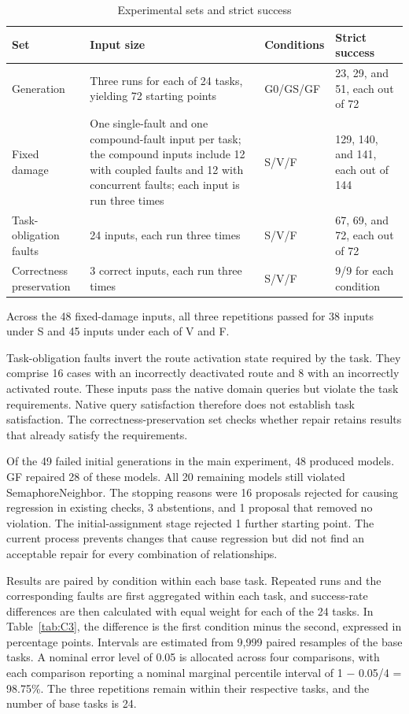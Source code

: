 \documentclass[pdflatex,iicol,sn-mathphys-num]{sn-jnl}
\begin{document}
\begin{table}[!tbp]
\centering
\caption{Experimental sets and strict success}\label{tab:C2}
\small
\setlength{\tabcolsep}{4pt}
\renewcommand{\arraystretch}{1.20}
\begin{tabularx}{\textwidth}{@{}L L L L@{}}
\toprule
\textbf{Set} & \textbf{Input size} & \textbf{Conditions} & \textbf{Strict success} \\
\midrule
Generation & Three runs for each of 24 tasks, yielding 72 starting points & G0/GS/GF & 23, 29, and 51, each out of 72 \\
Fixed damage & One single-fault and one compound-fault input per task; the compound inputs include 12 with coupled faults and 12 with concurrent faults; each input is run three times & S/V/F & 129, 140, and 141, each out of 144 \\
Task-obligation faults & 24 inputs, each run three times & S/V/F & 67, 69, and 72, each out of 72 \\
Correctness preservation & 3 correct inputs, each run three times & S/V/F & 9/9 for each condition \\
\bottomrule
\end{tabularx}
\end{table}

Across the 48 fixed-damage inputs, all three repetitions passed for 38 inputs under S and 45 inputs under each of V and F.

Task-obligation faults invert the route activation state required by the task. They comprise 16 cases with an incorrectly deactivated route and 8 with an incorrectly activated route. These inputs pass the native domain queries but violate the task requirements. Native query satisfaction therefore does not establish task satisfaction. The correctness-preservation set checks whether repair retains results that already satisfy the requirements.


Of the 49 failed initial generations in the main experiment, 48 produced models. GF repaired 28 of these models. All 20 remaining models still violated SemaphoreNeighbor. The stopping reasons were 16 proposals rejected for causing regression in existing checks, 3 abstentions, and 1 proposal that removed no violation. The initial-assignment stage rejected 1 further starting point. The current process prevents changes that cause regression but did not find an acceptable repair for every combination of relationships.


Results are paired by condition within each base task. Repeated runs and the corresponding faults are first aggregated within each task, and success-rate differences are then calculated with equal weight for each of the 24 tasks. In Table~\ref{tab:C3}, the difference is the first condition minus the second, expressed in percentage points. Intervals are estimated from 9,999 paired resamples of the base tasks. A nominal error level of 0.05 is allocated across four comparisons, with each comparison reporting a nominal marginal percentile interval of 1 \ensuremath{-} 0.05/4 = 98.75\%. The three repetitions remain within their respective tasks, and the number of base tasks is 24.
\end{document}
